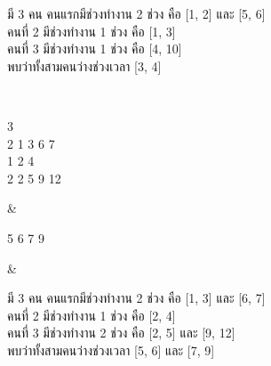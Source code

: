 \documentclass{article}
\begin{document}
{\begin{longtable}[]
\begin{minipage}[t]{\linewidth}
มี 3 คน คนแรกมีช่วงทำงาน 2 ช่วง คือ {[}1, 2{]} และ {[}5, 6{]}\\

คนที่ 2 มีช่วงทำงาน 1 ช่วง คือ {[}1, 3{]}\\

คนที่ 3 มีช่วงทำงาน 1 ช่วง คือ {[}4, 10{]}\\

พบว่าทั้งสามคนว่างช่วงเวลา {[}3, 4{]}\\

\strut

\end{minipage} \\

\begin{minipage}[t]{\linewidth}\raggedright

3\\

2 1 3 6 7\\

1 2 4\\

2 2 5 9 12\\

\strut

\end{minipage} & \begin{minipage}[t]{\linewidth}\raggedright

5 6 7 9\\

\strut

\end{minipage} & \begin{minipage}[t]{\linewidth}\raggedright

มี 3 คน คนแรกมีช่วงทำงาน 2 ช่วง คือ {[}1, 3{]} และ {[}6, 7{]}\\

คนที่ 2 มีช่วงทำงาน 1 ช่วง คือ {[}2, 4{]}\\

คนที่ 3 มีช่วงทำงาน 2 ช่วง คือ {[}2, 5{]} และ {[}9, 12{]}\\

พบว่าทั้งสามคนว่างช่วงเวลา {[}5, 6{]} และ {[}7, 9{]}\\

\strut

\end{minipage} \\

\end{longtable}

}
\end{document}
